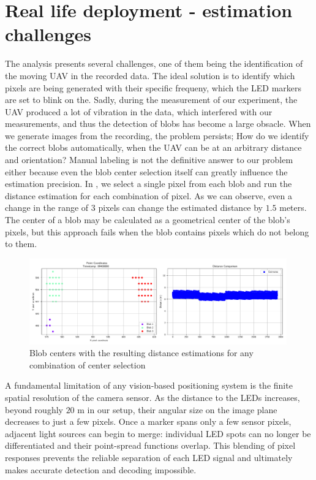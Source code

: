 \section{Real life deployment - estimation challenges}

The analysis presents several challenges, one of them being the identification of the moving \ac{UAV} in the recorded
data. The ideal solution is to identify which pixels are being generated with their specific frequeny, which the \ac{LED}
markers are set to blink on the. Sadly, during the measurement of our experiment, the \ac{UAV} produced a lot
of vibration in the data, which interfered with our measurements, and thus the detection of blobs has become a large obsacle.
When we generate images from the recording, the problem persists; How do we identify the correct blobs automatically, when
the \ac{UAV} can be at an arbitrary distance and orientation?
Manual labeling is not the definitive answer to our problem either because even the blob center selection itself can greatly
influence the estimation precision. In , we select a single pixel from each blob and run the distance estimation
for each combination of pixel. As we can observe, even a change in the range of 3 pixels can change the estimated distance by
$1.5$ meters. The center of a blob may be calculated as a geometrical center of the blob's pixels, but this approach fails
when the blob contains pixels which do not belong to them.

\begin{figure}[H]
	\centering
	\includegraphics[width=0.99\textwidth]{./fig/pgfplot/estimation_selection_1.pdf}
	\caption{Blob centers with the resulting distance estimations for any combination of center selection}
	\label{fig:blob_comb}
\end{figure}

A fundamental limitation of any vision‐based positioning system is the finite spatial resolution of the camera sensor. As the distance to the \ac{LED}s increases, beyond roughly $20$ m in our setup, their angular size on the image plane decreases to just a few pixels. Once a marker spans only a few sensor pixels, adjacent light sources can begin to merge: individual \ac{LED} spots can no longer be differentiated and their point-spread functions overlap. This blending of pixel responses prevents the reliable separation of each \ac{LED} signal and ultimately makes accurate detection and decoding impossible.
